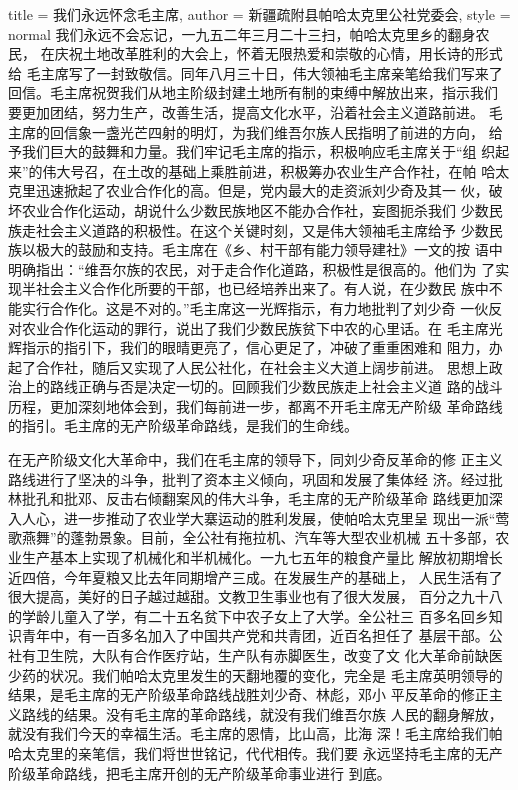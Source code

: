 \begin{hongqiarticle}{
        title  = {我们永远怀念毛主席},
        author = {新疆疏附县帕哈太克里公社党委会},
        style  = normal
    }
    我们永远不会忘记，一九五二年三月二十三扫，帕哈太克里乡的翻身农民，
    在庆祝土地改革胜利的大会上，怀着无限热爱和崇敬的心情，用长诗的形式给
    毛主席写了一封致敬信。同年八月三十日，伟大领袖毛主席亲笔给我们写来了
    回信。毛主席祝贺我们从地主阶级封建土地所有制的束缚中解放出来，指示我们
    要更加团结，努力生产，改善生活，提高文化水平，沿着社会主义道路前进。
    毛主席的回信象一盏光芒四射的明灯，为我们维吾尔族人民指明了前进的方向，
    给予我们巨大的鼓舞和力量。我们牢记毛主席的指示，积极响应毛主席关于“组
    织起来”的伟大号召，在土改的基础上乘胜前进，积极筹办农业生产合作社，在帕
    哈太克里迅速掀起了农业合作化的高。但是，党内最大的走资派刘少奇及其一
    伙，破坏农业合作化运动，胡说什么少数民族地区不能办合作社，妄图扼杀我们
    少数民族走社会主义道路的积极性。在这个关键时刻，又是伟大领袖毛主席给予
    少数民族以极大的鼓励和支持。毛主席在《乡、村干部有能力领导建社》一文的按
    语中明确指出：“维吾尔族的农民，对于走合作化道路，积极性是很高的。他们为
    了实现半社会主义合作化所要的干部，也已经培养出来了。有人说，在少数民
    族中不能实行合作化。这是不对的。”毛主席这一光辉指示，有力地批判了刘少奇
    一伙反对农业合作化运动的罪行，说出了我们少数民族贫下中农的心里话。在
    毛主席光辉指示的指引下，我们的眼晴更亮了，信心更足了，冲破了重重困难和
    阻力，办起了合作社，随后又实现了人民公社化，在社会主义大道上阔步前进。
    思想上政治上的路线正确与否是决定一切的。回顾我们少数民族走上社会主义道
    路的战斗历程，更加深刻地体会到，我们每前进一步，都离不开毛主席无产阶级
    革命路线的指引。毛主席的无产阶级革命路线，是我们的生命线。

    在无产阶级文化大革命中，我们在毛主席的领导下，同刘少奇反革命的修
    正主义路线进行了坚决的斗争，批判了资本主义倾向，巩固和发展了集体经
    济。经过批林批孔和批邓、反击右倾翻案风的伟大斗争，毛主席的无产阶级革命
    路线更加深入人心，进一步推动了农业学大寨运动的胜利发展，使帕哈太克里呈
    现出一派“莺歌燕舞”的蓬勃景象。目前，全公社有拖拉机、汽车等大型农业机械
    五十多部，农业生产基本上实现了机械化和半机械化。一九七五年的粮食产量比
    解放初期增长近四倍，今年夏粮又比去年同期增产三成。在发展生产的基础上，
    人民生活有了很大提高，美好的日子越过越甜。文教卫生事业也有了很大发展，
    百分之九十八的学龄儿童入了学，有二十五名贫下中农子女上了大学。全公社三
    百多名回乡知识青年中，有一百多名加入了中国共产党和共青团，近百名担任了
    基层干部。公社有卫生院，大队有合作医疗站，生产队有赤脚医生，改变了文
    化大革命前缺医少药的状况。我们帕哈太克里发生的天翻地覆的变化，完全是
    毛主席英明领导的结果，是毛主席的无产阶级革命路线战胜刘少奇、林彪，邓小
    平反革命的修正主义路线的结果。没有毛主席的革命路线，就没有我们维吾尔族
    人民的翻身解放，就没有我们今天的幸福生活。毛主席的恩情，比山高，比海
    深！毛主席给我们帕哈太克里的亲笔信，我们将世世铭记，代代相传。我们要
    永远坚持毛主席的无产阶级革命路线，把毛主席开创的无产阶级革命事业进行
    到底。


\end{hongqiarticle}

